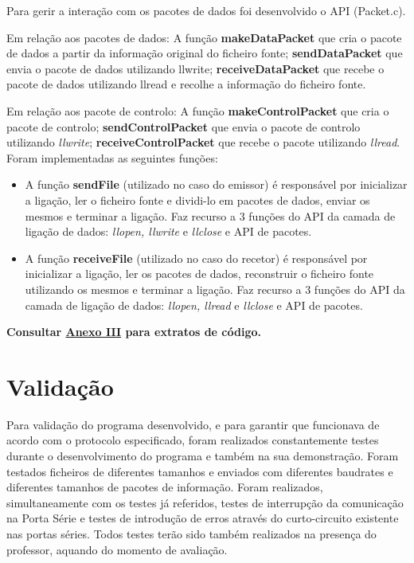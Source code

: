 \documentclass[a4paper, 11pt]{article}
\begin{document}
Para gerir a interação com os pacotes de dados foi desenvolvido o API (Packet.c).

Em relação aos pacotes de dados: 
A função \textbf{makeDataPacket} que cria o pacote de dados a partir da informação original do ficheiro fonte; \textbf{sendDataPacket} que envia o pacote de dados utilizando llwrite; \textbf{receiveDataPacket} que recebe o pacote de dados utilizando llread e recolhe a informação do ficheiro fonte.

Em relação aos pacote de controlo:
A função \textbf{makeControlPacket} que cria o pacote de controlo; \textbf{sendControlPacket} que envia o pacote de controlo utilizando \textit{llwrite}; \textbf{receiveControlPacket} que recebe o pacote utilizando \textit{llread}.\\

Foram implementadas as seguintes funções:
\begin{itemize}
	\item A função \textbf{sendFile} (utilizado no caso do emissor) é responsável por inicializar a ligação, ler o ficheiro fonte e dividi-lo em pacotes de dados, enviar os mesmos e terminar a ligação. Faz recurso a 3 funções do API da camada de ligação de dados: \textit{llopen, llwrite} e \textit{llclose} e API de pacotes.
	\item A função \textbf{receiveFile} (utilizado no caso do recetor) é responsável por inicializar a ligação, ler os pacotes de dados, reconstruir o ficheiro fonte utilizando os mesmos e terminar a ligação. Faz recurso a 3 funções do API da camada de ligação de dados: \textit{llopen, llread} e \textit{llclose} e API de pacotes.
\end{itemize}

\textbf{Consultar \underline{Anexo III} para extratos de código.}

\section{Validação}

Para validação do programa desenvolvido, e para garantir que funcionava de acordo com o protocolo especificado, foram realizados constantemente testes durante o desenvolvimento do programa e também na sua demonstração. Foram testados ficheiros de diferentes tamanhos e enviados com diferentes baudrates e diferentes tamanhos de pacotes de informação. Foram realizados, simultaneamente com os testes já referidos, testes de interrupção da comunicação na Porta Série e testes de introdução de erros através do curto-circuito existente nas portas séries. Todos testes terão sido também realizados na presença do professor, aquando do momento de avaliação.
\end{document}
